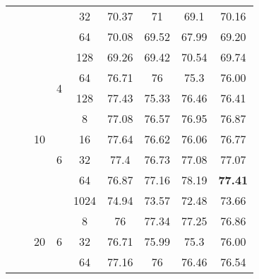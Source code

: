 \documentclass[fleqn,10pt]{wlscirep}
\begin{document}
\begin{table*}
{\begin{tabular}{|c|c|c|c|c|c|c|c|c|}
\cline{5-9}
                                           &                       &                     &                    & 32         & 70.37 & 71    & 69.1  & 70.16  \\ 
\cline{5-9}
                                           &                       &                     &                    & 64         & 70.08 & 69.52 & 67.99 & 69.20  \\ 
\cline{5-9}
                                           &                       &                     &                    & 128        & 69.26 & 69.42 & 70.54 & 69.74  \\ 
\cline{3-9}
                                           &                       & \multirow{7}{*}{10} & \multirow{2}{*}{4} & 64         & 76.71 & 76    & 75.3  & 76.00  \\ 
\cline{5-9}
                                           &                       &                     &                    & 128        & 77.43 & 75.33 & 76.46 & 76.41  \\ 
\cline{4-9}
                                           &                       &                     & \multirow{5}{*}{6} & 8          & 77.08 & 76.57 & 76.95 & 76.87  \\ 
\cline{5-9}
                                           &                       &                     &                    & 16         & 77.64 & 76.62 & 76.06 & 76.77  \\ 
\cline{5-9}
                                           &                       &                     &                    & 32         & 77.4  & 76.73 & 77.08 & 77.07  \\ 
\cline{5-9}
                                           &                       &                     &                    & 64         & 76.87 & 77.16 & 78.19 & \textbf{77.41}  \\ 
\cline{5-9}
                                           &                       &                     &                    & 1024       & 74.94 & 73.57 & 72.48 & 73.66  \\ 
\cline{3-9}
                                           &                       & \multirow{4}{*}{20} & \multirow{4}{*}{6} & 8          & 76    & 77.34 & 77.25 & 76.86  \\ 
\cline{5-9}
                                           &                       &                     &                    & 32         & 76.71 & 75.99 & 75.3  & 76.00  \\ 
\cline{5-9}
                                           &                       &                     &                    & 64         & 77.16 & 76    & 76.46 & 76.54  \\ 

\end{tabular}}
\end{table*}
\end{document}
